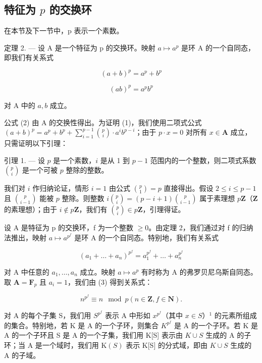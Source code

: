 \subsection{\texorpdfstring{特征为 \(p\) 的交换环}{特征为 p 的交换环}}

在本节及下一节中，p 表示一个素数。

定理 2. --- 设 A 是一个特征为 p 的交换环。映射 \(a \mapsto a^{p}\) 是环 A 的一个自同态，即我们有关系式

\[
(a + b) ^ {p} = a ^ {p} + b ^ {p}\tag{1}
\]

\[
(a b) ^ {p} = a ^ {p} b ^ {p}\tag{2}
\]

对 A 中的 \(a, b\) 成立。

公式 (2) 由 A 的交换性得出。为证明 (1)，我们使用二项式公式 \((a + b)^p = a^p + b^p + \sum_{i=1}^{p-1} \binom{p}{i} \cdot a^ib^{p-i}\)；由于 \(p \cdot x = 0\) 对所有 \(x \in \mathbf{A}\) 成立，只需证明以下引理：

引理 1. --- 设 \(p\) 是一个素数，\(i\) 是从 1 到 \(p - 1\) 范围内的一个整数，则二项式系数 \(\binom{p}{i}\) 是一个可被 \(p\) 整除的整数。

我们对 \(i\) 作归纳论证，情形 \(i = 1\) 由公式 \(\binom{p}{1} = p\) 直接得出。假设 \(2 \leqslant i \leqslant p - 1\) 且 \(\binom{p}{i - 1}\) 能被 \(p\) 整除。则整数 \(i\binom{p}{i} = (p - i + 1)\binom{p}{i - 1}\) 属于素理想 \(p\mathbf{Z}\)（\(\mathbf{Z}\) 的素理想）；由于 \(i \notin p\mathbf{Z}\)，我们有 \(\binom{p}{i} \in p\mathbf{Z}\)，引理得证。

设 A 是特征为 p 的交换环，f 为一个整数 \(\geqslant0\)。由定理 2，我们通过对 f 的归纳法推出，映射 \(a\mapsto a^{p^{f}}\) 是环 A 的一个自同态。特别地，我们有关系式

\[
(a _ {1} + \dots + a _ {n}) ^ {p ^ {f}} = a _ {1} ^ {p ^ {f}} + \dots + a _ {n} ^ {p ^ {f}}\tag{3}
\]

对 A 中任意的 \(a_{1},\ldots,a_{n}\) 成立。映射 \(a\mapsto a^{p}\) 有时称为 A 的弗罗贝尼乌斯自同态。取 \(\mathbf{A}=\mathbf{F}_{p}\) 且 \(a_{i}=1\)，我们由 (3) 得到关系式：

\[
n ^ {p ^ {f}} \equiv n \mod p (n \in \mathbf {Z}, f \in \mathbf {N}).\tag{4}
\]

对 A 的每个子集 S，我们用 \(S^{p^{f}}\) 表示 A 中形如 \(x^{p^{f}}\)（其中 \(x \in S\)）\(^{1}\) 的元素所组成的集合。特别地，若 K 是 A 的一个子环，则集合 \(K^{p^{f}}\) 是 A 的一个子环。若 K 是 A 的一个子环且 S 是 A 的一个子集，我们用 K{[}S{]} 表示由 \(K \cup S\) 生成的 A 的子环；当 A 是一个域时，我们用 \(\mathrm{K}(S)\) 表示 K{[}S{]} 的分式域，即由 \(K \cup S\) 生成的 A 的子域。

